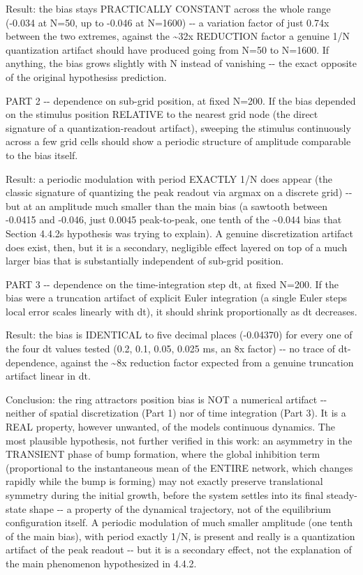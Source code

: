 \documentclass[
  english,
]{article}
\begin{document}
Result: the bias stays PRACTICALLY CONSTANT across the whole range (-0.034 at N=50, up to -0.046 at N=1600) -\/- a variation factor of just 0.74x between the two extremes, against the \textasciitilde32x REDUCTION factor a genuine 1/N quantization artifact should have produced going from N=50 to N=1600. If anything, the bias grows slightly with N instead of vanishing -\/- the exact opposite of the original hypothesis\textquotesingle s prediction.

PART 2 -\/- dependence on sub-grid position, at fixed N=200. If the bias depended on the stimulus position RELATIVE to the nearest grid node (the direct signature of a quantization-readout artifact), sweeping the stimulus continuously across a few grid cells should show a periodic structure of amplitude comparable to the bias itself.

Result: a periodic modulation with period EXACTLY 1/N does appear (the classic signature of quantizing the peak readout via argmax on a discrete grid) -\/- but at an amplitude much smaller than the main bias (a sawtooth between -0.0415 and -0.046, just 0.0045 peak-to-peak, one tenth of the \textasciitilde0.044 bias that Section 4.4.2\textquotesingle s hypothesis was trying to explain). A genuine discretization artifact does exist, then, but it is a secondary, negligible effect layered on top of a much larger bias that is substantially independent of sub-grid position.

PART 3 -\/- dependence on the time-integration step dt, at fixed N=200. If the bias were a truncation artifact of explicit Euler integration (a single Euler step\textquotesingle s local error scales linearly with dt), it should shrink proportionally as dt decreases.

Result: the bias is IDENTICAL to five decimal places (-0.04370) for every one of the four dt values tested (0.2, 0.1, 0.05, 0.025 ms, an 8x factor) -\/- no trace of dt-dependence, against the \textasciitilde8x reduction factor expected from a genuine truncation artifact linear in dt.

Conclusion: the ring attractor\textquotesingle s position bias is NOT a numerical artifact -\/- neither of spatial discretization (Part 1) nor of time integration (Part 3). It is a REAL property, however unwanted, of the model\textquotesingle s continuous dynamics. The most plausible hypothesis, not further verified in this work: an asymmetry in the TRANSIENT phase of bump formation, where the global inhibition term (proportional to the instantaneous mean of the ENTIRE network, which changes rapidly while the bump is forming) may not exactly preserve translational symmetry during the initial growth, before the system settles into its final steady-state shape -\/- a property of the dynamical trajectory, not of the equilibrium configuration itself. A periodic modulation of much smaller amplitude (one tenth of the main bias), with period exactly 1/N, is present and really is a quantization artifact of the peak readout -\/- but it is a secondary effect, not the explanation of the main phenomenon hypothesized in 4.4.2.
\end{document}
